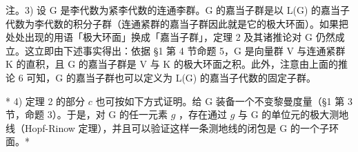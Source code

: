注。3) 设 G 是李代数为紧李代数的连通李群。G 的嘉当子群是以 L(G) 的嘉当子代数为李代数的积分子群（连通紧群的嘉当子群因此就是它的极大环面）。如果把处处出现的用语「极大环面」换成「嘉当子群」，定理 2 及其诸推论对 G 仍然成立。这立即由下述事实得出：依据 §1 第 4 节命题 5，G 是向量群 V 与连通紧群 K 的直积，且 G 的嘉当子群是 V 与 K 的极大环面之积。此外，注意由上面的推论 6 可知，G 的嘉当子群也可以定义为 L(G) 的嘉当子代数的固定子群。

* 4) 定理 2 的部分 \(c\) 也可按如下方式证明。给 G 装备一个不变黎曼度量（§1 第 3 节，命题 3）。于是，对 G 的任一元素 \(g\) ，存在通过 \(g\) 与 G 的单位元的极大测地线（Hopf-Rinow 定理），并且可以验证这样一条测地线的闭包是 G 的一个子环面。*

